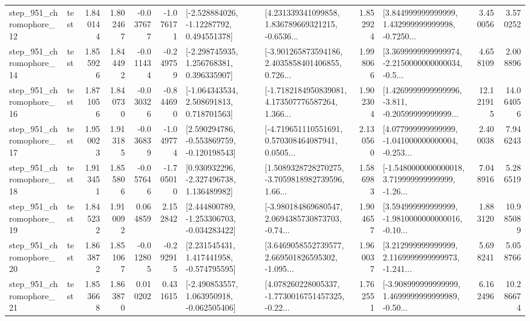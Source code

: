 \begin{tabular}{llrrrrllrlrr}
  step\_951\_chromophore\_12 &      test &      1.840144 &    1.802467 &     -0.037677 & -1.076171 &    [-2.528884026, -1.12287792, 0.494551378] &  [4.231339341099858, 1.836789669321215, -0.6536... &       1.852924 &  [3.844999999999999, 1.432999999999998, -0.7250... &            3.450056 &          3.570252 \\
  step\_951\_chromophore\_14 &      test &      1.855926 &    1.844492 &     -0.011434 & -0.249759 &    [-2.298745935, 1.256768381, 0.396335907] &  [-3.901265873594186, 2.4035858401406855, 0.726... &       1.998066 &  [3.3699999999999974, -2.2150000000000034, -0.5... &            4.658109 &          2.008896 \\
  step\_951\_chromophore\_16 &      test &      1.871056 &    1.840730 &     -0.030326 & -0.844690 &    [-1.064343534, 2.508691813, 0.718701563] &  [-1.7182184950839081, 4.173507776587264, 1.366... &       1.902304 &  [1.4269999999999996, -3.811, -0.20599999999999... &           12.121915 &         14.064056 \\
  step\_951\_chromophore\_17 &      test &      1.950023 &    1.913185 &     -0.036839 & -1.049774 &   [2.590294786, -0.553869759, -0.120198543] &  [-4.719651110551691, 0.570308464087941, 0.0505... &       2.130560 &  [4.077999999999999, -1.041000000000004, -0.253... &            2.400038 &          7.946243 \\
  step\_951\_chromophore\_18 &      test &      1.913451 &    1.855806 &     -0.057646 & -1.705010 &    [0.930932296, -2.327496738, 1.136489982] &  [1.5089328728270275, -3.7059818982739596, 1.66... &       1.586983 &  [-1.5480000000000018, 3.719999999999999, -1.26... &            7.048916 &          5.286519 \\
  step\_951\_chromophore\_19 &      test &      1.845232 &    1.910092 &      0.064859 &  2.152842 &   [2.444800789, -1.253306703, -0.034283422] &  [-3.980184869680547, 2.0694385730873703, -0.74... &       1.904657 &  [3.594999999999999, -1.9810000000000016, -0.10... &            1.883120 &         10.985089 \\
  step\_951\_chromophore\_20 &      test &      1.863872 &    1.851067 &     -0.012805 & -0.292915 &    [2.231545431, 1.417441958, -0.574795595] &  [3.6469058552739577, 2.669501826595302, -1.095... &       1.960037 &  [3.212999999999999, 2.1169999999999973, -1.241... &            5.698241 &          5.058766 \\
  step\_951\_chromophore\_21 &      test &      1.853668 &    1.863870 &      0.010202 &  0.431615 &   [-2.490853557, 1.063950918, -0.062505406] &  [4.078260228005337, -1.7730016751457325, -0.22... &       1.762551 &  [-3.908999999999999, 1.4699999999999989, -0.50... &            6.162496 &         10.286674 \\

\end{tabular}
